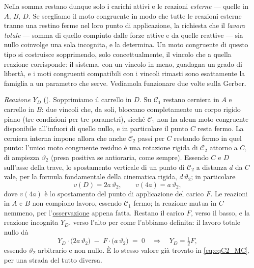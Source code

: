 Nella somma restano dunque solo i carichi attivi e le reazioni
\emph{esterne} --- quelle in $A$, $B$, $D$. Se scegliamo il moto
congruente in modo che tutte le reazioni esterne tranne una restino
ferme nel loro punto di applicazione, la richiesta che il \textit{lavoro totale} --- somma 
di quello compiuto dalle forze attive e da quelle reattive --- sia nullo coinvolge una sola incognita, e la determina. Un moto congruente
di questo tipo si costruisce sopprimendo, solo concettualmente, il
vincolo che a quella reazione corrisponde: il sistema, con un vincolo in
meno, guadagna un grado di libertà, e i moti congruenti compatibili con
i vincoli rimasti sono esattamente la famiglia a un parametro che serve.
Vediamola funzionare due volte sulla Gerber.

\medskip

\emph{Reazione $Y_D$} (). Sopprimiamo il
carrello in $D$. Su $\mathcal{C}_1$ restano cerniera in $A$ e carrello in
$B$: due vincoli che, da soli, bloccano completamente un corpo rigido
piano (tre condizioni per tre parametri), sicché $\mathcal{C}_1$ non ha
alcun moto congruente disponibile all'infuori di quello nullo, e in
particolare il punto $C$ resta fermo. La cerniera interna impone allora
che anche $\mathcal{C}_2$ passi per $C$ restando fermo in quel punto:
l'unico moto congruente residuo è una rotazione rigida di
$\mathcal{C}_2$ attorno a $C$, di ampiezza $\vartheta_2$ (presa positiva
se antioraria, come sempre). Essendo $C$ e $D$ sull'asse della trave, lo
spostamento verticale di un punto di $\mathcal{C}_2$ a distanza $d$ da
$C$ vale, per la formula fondamentale della cinematica rigida, $d\,
\vartheta_2$; in particolare
\[
v(D) = 2a\,\vartheta_2, \qquad v(4a) = a\,\vartheta_2,
\]
dove $v(4a)$ è lo spostamento del punto di applicazione del carico $F$.
Le reazioni in $A$ e $B$ non compiono lavoro, essendo $\mathcal{C}_1$
fermo; la reazione mutua in $C$ nemmeno, per l'\hyperref[]{osservazione}
appena fatta. Restano il carico $F$, verso il basso, e la reazione
incognita $Y_D$, verso l'alto per come l'abbiamo definita: il lavoro
totale nullo dà
\begin{equation}\label{eq:sopp_YD}
Y_D\cdot\bigl(2a\,\vartheta_2\bigr) \;-\; F\cdot\bigl(a\,
\vartheta_2\bigr) \;=\; 0
\quad\Longrightarrow\quad Y_D = \tfrac12 F,
\end{equation}
essendo $\vartheta_2$ arbitrario e non nullo. È lo stesso valore già
trovato in \eqref{eq:eqC2_MC}, per una strada del tutto diversa.





